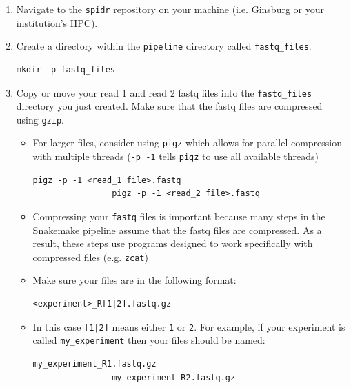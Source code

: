 \documentclass{article}
\begin{document}
    \begin{enumerate}
        \item Navigate to the \texttt{spidr} repository on your machine (i.e. Ginsburg or your institution's HPC).
        
        \item Create a directory within the \texttt{pipeline} directory called \texttt{fastq\_files}.
        \begin{lstlisting}[style=bashstyle]
            mkdir -p fastq_files
        \end{lstlisting}
        
        \item Copy or move your read 1 and read 2 fastq files into the \texttt{fastq\_files} directory you just created. Make sure that the fastq files are compressed using \texttt{gzip}.
        \begin{itemize}
            \item For larger files, consider using \texttt{pigz} which allows for parallel compression with multiple threads (\texttt{-p -1} tells \texttt{pigz} to use all available threads)
            \begin{lstlisting}[style=bashstyle]
                pigz -p -1 <read_1 file>.fastq
                pigz -p -1 <read_2 file>.fastq
            \end{lstlisting}
            \item Compressing your \texttt{fastq} files is important because many steps in the Snakemake pipeline assume that the fastq files are compressed. As a result, these steps use programs designed to work specifically with compressed files (e.g. \texttt{zcat})
            \item Make sure your files are in the following format:
            \begin{lstlisting}[style=bashstyle]
                <experiment>_R[1|2].fastq.gz
            \end{lstlisting}
            \item In this case \texttt{[1|2]} means either \texttt{1} or \texttt{2}. For example, if your experiment is called \texttt{my\_experiment} then your files should be named:
            \begin{lstlisting}[style=bashstyle]
                my_experiment_R1.fastq.gz
                my_experiment_R2.fastq.gz
            \end{lstlisting}
        \end{itemize}
        

\end{enumerate}
\end{document}
